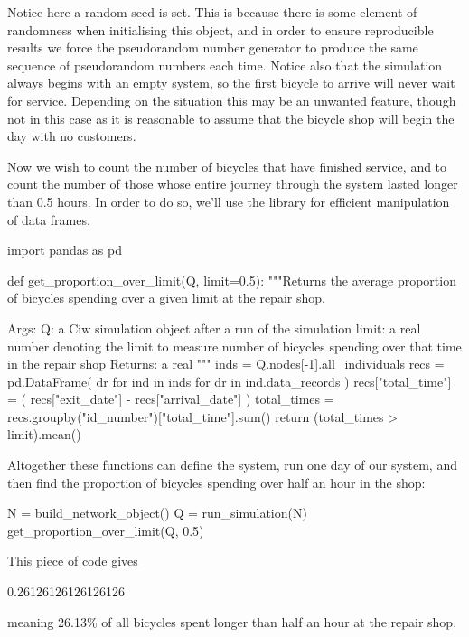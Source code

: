 Notice here a random seed is set. This is because there is some element of
randomness when initialising this object, and in order to ensure reproducible
results we force the pseudorandom number generator to produce the same sequence
of pseudorandom numbers each time.
Notice also that the simulation always begins with an empty system, so the first
bicycle to arrive will never wait for service. Depending on the situation this
may be an unwanted feature, though not in this case as it is reasonable to
assume that the bicycle shop will begin the day with no customers.

Now we wish to count the number of bicycles that have finished service, and to
count the number of those whose entire journey through the system lasted longer
than 0.5 hours. In order to do so, we'll use the  library for
efficient manipulation of data frames.

\begin{pyin}
import pandas as pd

def get_proportion_over_limit(Q, limit=0.5):
    """Returns the average proportion of bicycles spending
    over a given limit at the repair shop.
    
    Args:
        Q: a Ciw simulation object after a run of the
           simulation
        limit: a real number denoting the limit to measure
               number of bicycles spending over that time in
               the repair shop    
    Returns:
        a real
    """
    inds = Q.nodes[-1].all_individuals
    recs = pd.DataFrame(
        dr for ind in inds for dr in ind.data_records
    )
    recs["total_time"] = (
        recs["exit_date"] - recs["arrival_date"]
    )
    total_times = recs.groupby("id_number")["total_time"].sum()
    return (total_times > limit).mean()
\end{pyin}

Altogether these functions can define the system, run one day of our system, and
then find the proportion of bicycles spending over half an hour in the shop:

\begin{pyin}
N = build_network_object()
Q = run_simulation(N)
get_proportion_over_limit(Q, 0.5)
\end{pyin}

This piece of code gives

\begin{pyout}
0.26126126126126126
\end{pyout}

meaning 26.13\% of all bicycles spent longer than half an hour at the repair
shop.

